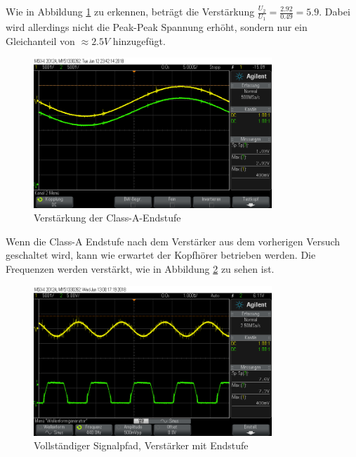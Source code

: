 \documentclass[a4paper]{article}
\begin{document}
Wie in Abbildung \ref{fig:versuch3-verstaerkung} zu erkennen, beträgt die Verstärkung $\frac{U_2}{U_1}=\frac{2.92}{0.49}=5.9$. Dabei wird allerdings nicht die Peak-Peak Spannung erhöht, sondern nur ein Gleichanteil von $\approx 2.5\si{V}$ hinzugefügt.


\begin{figure}[H]
    \centering
    \includegraphics[width=0.8\textwidth]{versuch3/versuch3_endstufe.png}
    \caption{Verstärkung der Class-A-Endstufe}
    \label{fig:versuch3-verstaerkung}
\end{figure}


Wenn die Class-A Endstufe nach dem Verstärker aus dem vorherigen Versuch geschaltet wird, kann wie erwartet der Kopfhörer betrieben werden. Die Frequenzen werden verstärkt, wie in Abbildung \ref{fig:versuch3-audio} zu sehen ist.

\begin{figure}[H]
    \centering
    \includegraphics[width=0.8\textwidth]{versuch3/versuch3_audio.png}
    \caption{Vollständiger Signalpfad, Verstärker mit Endstufe}
    \label{fig:versuch3-audio}
\end{figure}
\end{document}
